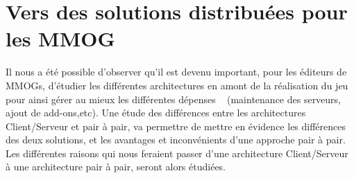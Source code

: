 \section{Vers des solutions distribuées pour les MMOG}
	\label{whyp2p}
	Il nous a été possible d'observer qu'il est devenu important, pour les éditeurs de MMOGs, d'étudier les différentes architectures en amont de la réalisation du jeu pour ainsi gérer au mieux les différentes dépenses ~\cite{14101410} (maintenance des serveurs, ajout de add-ons,etc). Une étude des différences entre les architectures Client/Serveur et pair à pair, va permettre de mettre en évidence les différences des deux solutions, et les avantages et inconvénients d'une approche pair à pair. Les différentes raisons qui nous feraient passer d'une architecture Client/Serveur à une architecture pair à pair, seront alors étudiées. 

